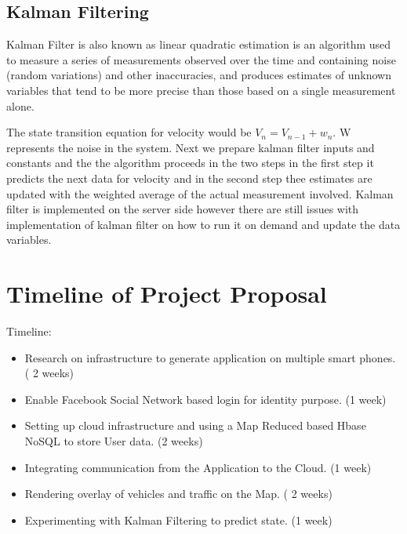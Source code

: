 \documentclass[10pt]{sigplan-proc-varsize}
\begin{document}
\subsection{Kalman Filtering}
Kalman Filter is also known as linear quadratic estimation is an algorithm used to measure a series of measurements observed over the time and containing noise (random variations) and other inaccuracies, and produces estimates of unknown variables that tend to be more precise than those based on a single measurement alone.

The state transition equation for velocity would be 
\begin{math}
V_n = V_{n-1} + w_n
\end{math}. W represents the noise in the system. Next we prepare kalman filter inputs and constants and the the algorithm proceeds in the two steps in the first step it predicts the next data for velocity and in the second step thee estimates are updated with the weighted average of the actual measurement involved. Kalman filter is implemented on the server side however there are still issues with implementation of kalman filter on how to run it on demand and update the data variables.

\section{Timeline of Project Proposal}
Timeline:
\begin{itemize}
\item Research on infrastructure to generate application on multiple smart phones. ( 2 weeks)
\item Enable Facebook Social Network based login for identity purpose. (1 week)
\item Setting up cloud infrastructure and using a Map Reduced based Hbase NoSQL to store User data. (2 weeks)
\item Integrating communication from the Application to the Cloud. (1 week)
\item Rendering overlay of vehicles and traffic on the Map. ( 2 weeks)
\item Experimenting with Kalman Filtering to predict state. (1 week)
\end{itemize}
\end{document}
